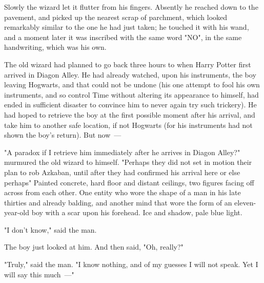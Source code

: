 Slowly the wizard let it flutter from his fingers. Absently he reached down to
the pavement, and picked up the nearest scrap of parchment, which looked
remarkably similar to the one he had just taken; he touched it with his wand,
and a moment later it was inscribed with the same word "NO", in the same
handwriting, which was his own.

The old wizard had planned to go back three hours to when Harry Potter first
arrived in Diagon Alley. He had already watched, upon his instruments, the boy
leaving Hogwarts, and that could not be undone (his one attempt to fool his own
instruments, and so control Time without altering its appearance to himself,
had ended in sufficient disaster to convince him to never again try such
trickery). He had hoped to retrieve the boy at the first possible moment after
his arrival, and take him to another safe location, if not Hogwarts (for his
instruments had not shown the boy's return). But now~---

"A paradox if I retrieve him immediately after he arrives in Diagon Alley?"
murmured the old wizard to himself. "Perhaps they did not set in motion their
plan to rob Azkaban, until after they had confirmed his arrival here{\el} or
else{\el} perhaps{\el}"
\sbreak
Painted concrete, hard floor and distant ceilings, two figures facing off
across from each other. One entity who wore the shape of a man in his late
thirties and already balding, and another mind that wore the form of an
eleven-year-old boy with a scar upon his forehead. Ice and shadow, pale blue
light.

"I don't know," said the man.

The boy just looked at him. And then said, "Oh, really?"

"Truly," said the man. "I know nothing, and of my guesses I will not speak. Yet
I will say this much~---"
